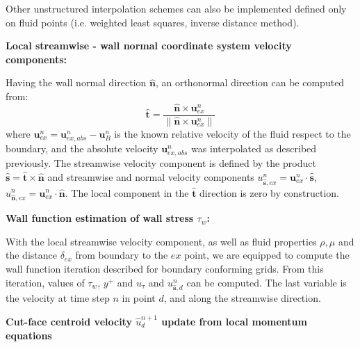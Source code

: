 \documentclass[12pt]{article}
\begin{document}
Other unstructured interpolation schemes can also be implemented defined only on fluid points (i.e. weighted least squares, inverse distance method).


\bigskip
\noindent
\textbf{Local streamwise - wall normal coordinate system velocity components:}
\bigskip

Having the wall normal direction $\hat{\mathbf{n}}$, an orthonormal direction can be computed from:
%
\begin{equation}
    \hat{\mathbf{t}} = \frac{\hat{\mathbf{n}} \times \mathbf{u}_{ex}^n}{\| \hat{\mathbf{n}} \times \mathbf{u}_{ex}^n \| }
\end{equation}
%
where $\mathbf{u}_{ex}^n=\mathbf{u}_{ex,abs}^n-\mathbf{u}_{B}^n$ is the known relative velocity of the fluid respect to the boundary, and the absolute velocity $\mathbf{u}_{ex,abs}^n$ was interpolated as described previously.
The streamwise velocity component is defined by the product $\hat{\mathbf{s}} = \hat{\mathbf{t}} \times \hat{\mathbf{n}}$ and streamwise and normal velocity components  $u_{\hat{\mathbf{s}},ex}^n= \mathbf{u}_{ex}^n \cdot \hat{\mathbf{s}}$, $u_{\hat{\mathbf{n}},ex}^n= \mathbf{u}_{ex}^n \cdot \hat{\mathbf{n}}$. The local component in the $\hat{\mathbf{t}}$ direction is zero by construction.

\bigskip
\noindent 
\textbf{Wall function estimation of wall stress $\tau_w$:}
 
With the local streamwise velocity component, as well as fluid properties $\rho, \mu$ and the distance $\delta_{ex}$ from boundary to the $ex$ point, we are equipped to compute the wall function iteration described for boundary conforming grids. From this iteration, values of $\tau_w$, $y^+$ and $u_\tau$ and $u_{\hat{\mathbf{s}},d}^n$ can be computed. The last variable is the velocity at time step $n$ in point $d$, and along the streamwise direction. 
 
\bigskip
\noindent
\textbf{Cut-face centroid velocity $\hat{u}_d^{n+1}$ update from local momentum equations}
\bigskip
\end{document}
